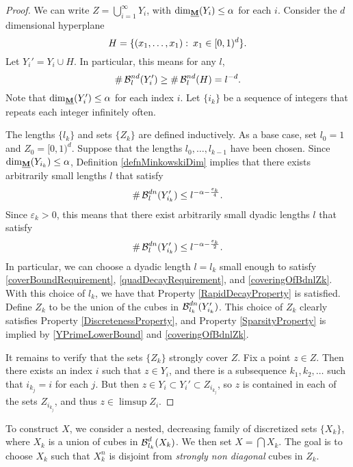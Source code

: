 \begin{proof}
	We can write $Z = \bigcup_{i = 1}^\infty Y_i$, with $\operatorname{\dim_{\underline{\mathbf{M}}}}(Y_i) \leq \alpha$ for each $i$. Consider the $d$ dimensional hyperplane
	\[ H = \{ (x_1,\dots, x_1) \operatorname{\colon} x_1 \in [0,1)^d \}. \]
	Let $Y_i' = Y_i \cup H$. In particular, this means for any $l$,
	\begin{equation}\label{YPrimeLowerBound}
		\# \operatorname{\mathcal{B}}^{nd}_l(Y_i') \geq \# \operatorname{\mathcal{B}}^{nd}_l(H) = l^{-d}.
	\end{equation}
	Note that $\operatorname{\dim_{\underline{\mathbf{M}}}}(Y_i') \leq \alpha$ for each index $i$. Let $\{ i_k \}$ be a sequence of integers that repeats each integer infinitely often.

	The lengths $\{ l_k \}$ and sets $\{ Z_k \}$ are defined inductively. As a base case, set $l_0 = 1$ and $Z_0 = [0,1)^d$. Suppose that the lengths $l_0, \ldots, l_{k-1}$ have been chosen. Since $\operatorname{\dim_{\underline{\mathbf{M}}}}(Y_{i_k}) \leq \alpha$, Definition \ref{defnMinkowskiDim} implies that there exists arbitrarily small lengths $l$ that satisfy
\[ \# \operatorname{\mathcal{B}}^{dn}_l(Y_{i_k}') \leq l^{-\alpha - \frac{\varepsilon_k}{4}}. \]
Since $\varepsilon_k>0$, this means that there exist arbitrarily small dyadic lengths $l$ that satisfy
	\begin{equation}\label{coveringOfBdnlZk}
		\# \operatorname{\mathcal{B}}^{dn}_l(Y_{i_k}') \leq l^{-\alpha - \frac{\varepsilon_k}{2}}.
	\end{equation}
	In particular, we can choose a dyadic length $l = l_k$ small enough to satisfy \eqref{coverBoundRequirement}, \eqref{quadDecayRequirement}, and \eqref{coveringOfBdnlZk}. With this choice of $l_k$, we have that Property \ref{RapidDecayProperty} is satisfied. Define $Z_k$ to be the union of the cubes in $\operatorname{\mathcal{B}}^{dn}_{l_k}(Y_{i_k}')$.  This choice of $Z_k$ clearly satisfies Property \ref{DiscretenessProperty}, and Property \ref{SparsityProperty} is implied by \eqref{YPrimeLowerBound} and \eqref{coveringOfBdnlZk}.

	It remains to verify that the sets $\{Z_k\}$ strongly cover $Z$. Fix a point $z \in Z$. Then there exists an index $i$ such that $z \in Y_i$, and there is a subsequence $k_1, k_2, \dots$ such that $i_{k_j} = i$ for each $j$. But then $z \in Y_i \subset Y_i' \subset Z_{i_{k_j}}$, so $z$ is contained in each of the sets $Z_{i_{k_j}}$, and thus $z \in \limsup Z_i$.
\end{proof}

To construct $X$, we consider a nested, decreasing family of discretized sets $\{ X_k \}$, where $X_k$ is a union of cubes in $\operatorname{\mathcal{B}}^d_{l_k}(X_k)$. We then set $X = \bigcap X_k$. The goal is to choose $X_k$ such that $X_k^n$ is disjoint from {\it strongly non diagonal} cubes in $Z_k$.

